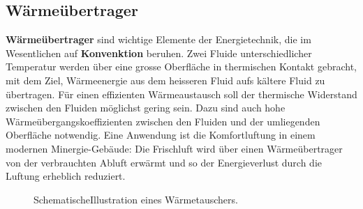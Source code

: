 \subsection{Wärmeübertrager}
\textbf{Wärmeübertrager} sind wichtige Elemente der Energietechnik, die im Wesentlichen auf \textbf{Konvenktion} beruhen. Zwei Fluide unterschiedlicher Temperatur werden über eine grosse Oberfläche in thermischen Kontakt gebracht, mit dem Ziel, Wärmeenergie aus dem heisseren Fluid aufs kältere Fluid zu übertragen. Für einen effizienten Wärmeaustausch soll der thermische Widerstand zwischen den Fluiden möglichst gering sein. Dazu sind auch hohe Wärmeübergangskoeffizienten zwischen den Fluiden und der umliegenden Oberfläche notwendig. Eine Anwendung ist die Komfortluftung in einem modernen Minergie-Gebäude: Die Frischluft wird über einen Wärmeübertrager von der verbrauchten Abluft erwärmt und so der Energieverlust durch die Luftung erheblich reduziert.
\begin{figure}[H]
\centering
\caption{SchematischeIllustration eines Wärmetauschers.}
\label{fig_In}
\end{figure}
